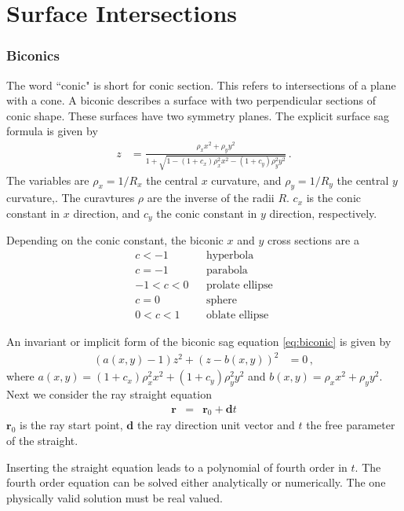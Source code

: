 \documentclass[12pt,a4paper,twoside,openright,BCOR10mm,headsepline,titlepage,abstracton,chapterprefix,final]{scrreprt}
\newcommand\Vector[1]{{\mathbf{#1}}}
\newcommand\Location{\Vector{r}}
\begin{document}
\chapter{Surface Intersections}\label{subsec:intersectionformulas}

\subsection{Biconics}
The word ``conic" is short for conic section. 
This refers to intersections of a plane with a cone.
A biconic describes a surface with two perpendicular sections of conic shape. 
These surfaces have two symmetry planes.
The explicit surface sag formula is given by
\begin{align}
 z &= \frac{\rho_x x^2 + \rho_y y^2}{1 + \sqrt{1 - (1+c_x) \rho_x^2 x^2 - (1+c_y) \rho_y^2 y^2}} \label{eq:biconic}\,.
\end{align}
The variables are $\rho_x = 1/R_x$ the central $x$ curvature, and $\rho_y = 1/R_y$ the central $y$ curvature,.
The curavtures $\rho$ are the inverse of the radii $R$.
$c_x$ is the conic constant in $x$ direction,
and $c_y$ the conic constant in $y$ direction, respectively. 

Depending on the conic constant, the biconic $x$ and $y$ cross sections are a
\begin{eqnarray*}
     c < -1 && \textrm{hyperbola} \\
     c = -1 && \textrm{parabola} \\
-1 < c < 0 && \textrm{prolate ellipse} \\
     c = 0 && \textrm{sphere} \\
 0 < c < 1 && \textrm{oblate ellipse}
\end{eqnarray*}


An invariant or implicit form of the biconic sag equation \eqref{eq:biconic} is given by
\begin{align}
 (a(x,y) - 1) z^2 + (z - b(x,y))^2 &= 0\,,\label{eq:biconicImplicitSag}
\end{align}
where $a(x,y) = (1 + c_x) \rho_x^2 x^2 + (1 + c_y) \rho_y^2 y^2$ and $b(x,y) = \rho_x x^2 + \rho_y y^2$. 
Next we consider the ray straight equation
\begin{eqnarray}
 \Location &=& \Location_0 + \Vector{d} t \label{eq:ray}
\end{eqnarray}
$\Location_0$ is the ray start point, $\Vector{d}$ the ray direction unit vector and $t$ the free parameter of the straight.

Inserting the straight equation leads to a polynomial of fourth order in $t$.
The fourth order equation can be solved either analytically or numerically.
The one physically valid solution must be real valued.
\end{document}

